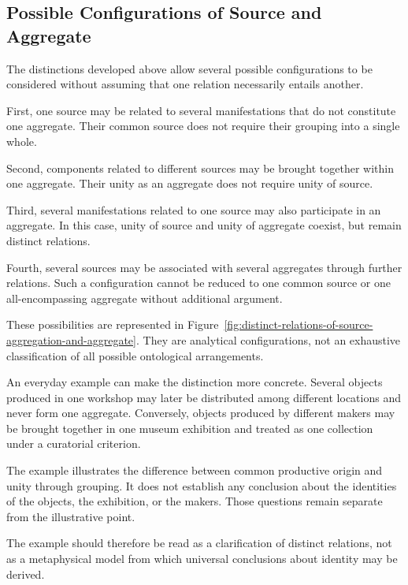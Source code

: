 \subsection{Possible Configurations of Source and Aggregate}

The distinctions developed above allow
several possible configurations to be
considered without assuming that one
relation necessarily entails another.

First, one source may be related to several
manifestations that do not constitute
one aggregate. Their common source does
not require their grouping into a single
whole.

Second, components related to different
sources may be brought together within
one aggregate. Their unity as an aggregate
does not require unity of source.

Third, several manifestations related
to one source may also participate in
an aggregate. In this case, unity of source
and unity of aggregate coexist, but remain
distinct relations.

Fourth, several sources may be associated
with several aggregates through further
relations. Such a configuration cannot
be reduced to one common source or one
all-encompassing aggregate without
additional argument.

These possibilities are represented
in Figure~\ref{fig:distinct-relations-of-source-aggregation-and-aggregate}.
They are analytical configurations,
not an exhaustive classification of
all possible ontological arrangements.

An everyday example can make the distinction
more concrete. Several objects produced
in one workshop may later be distributed
among different locations and never
form one aggregate. Conversely, objects
produced by different makers may be
brought together in one museum exhibition
and treated as one collection under
a curatorial criterion.

The example illustrates the difference
between common productive origin and
unity through grouping. It does not
establish any conclusion about the
identities of the objects, the exhibition,
or the makers. Those questions remain
separate from the illustrative point.



The example should therefore be read
as a clarification of distinct relations,
not as a metaphysical model from which
universal conclusions about identity
may be derived.

